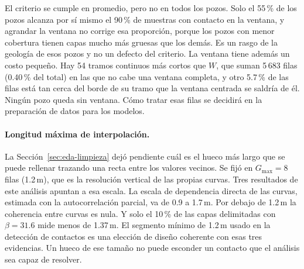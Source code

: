 \documentclass[11pt,a4paper]{article}
\begin{document}
El criterio se cumple en promedio, pero no en todos los pozos. Solo el 55\,\% de los pozos alcanza por sí mismo el 90\,\% de muestras con contacto en la ventana, y agrandar la ventana no corrige esa proporción, porque los pozos con menor cobertura tienen capas mucho más gruesas que los demás. Es un rasgo de la geología de esos pozos y no un defecto del criterio. La ventana tiene además un costo pequeño. Hay 54 tramos continuos más cortos que $W$, que suman 5\,683 filas (0.40\,\% del total) en las que no cabe una ventana completa, y otro 5.7\,\% de las filas está tan cerca del borde de su tramo que la ventana centrada se saldría de él. Ningún pozo queda sin ventana. Cómo tratar esas filas se decidirá en la preparación de datos para los modelos.

\paragraph{Longitud máxima de interpolación.} La Sección~\ref{sec:eda-limpieza} dejó pendiente cuál es el hueco más largo que se puede rellenar trazando una recta entre los valores vecinos. Se fijó en $G_{\max} = 8$ filas (1.2\,m), que es la resolución vertical de las propias curvas. Tres resultados de este análisis apuntan a esa escala. La escala de dependencia directa de las curvas, estimada con la autocorrelación parcial, va de 0.9 a 1.7\,m. Por debajo de 1.2\,m la coherencia entre curvas es nula. Y solo el 10\,\% de las capas delimitadas con $\beta = 31.6$ mide menos de 1.37\,m. El segmento mínimo de 1.2\,m usado en la detección de contactos es una elección de diseño coherente con esas tres evidencias. Un hueco de ese tamaño no puede esconder un contacto que el análisis sea capaz de resolver.
\end{document}
